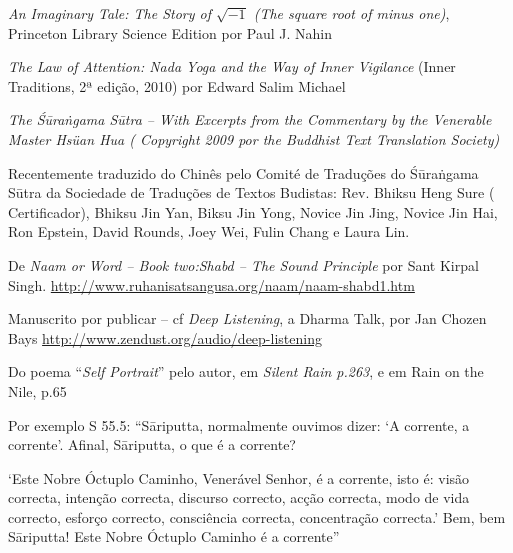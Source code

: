 \begin{thebibliography}{9}

 \emph{An Imaginary Tale: The Story of $\sqrt{-1}$ (The square root of
    minus one)}, Princeton Library Science Edition por Paul J. Nahin

 \emph{The Law of Attention: Nada Yoga and the Way of Inner Vigilance} (Inner Traditions, 2ª edição, 2010) por Edward Salim Michael
  
 \emph{The Śūraṅgama Sūtra -- With Excerpts from the
    Commentary by the Venerable Master Hsüan Hua ( Copyright 2009 por the
    Buddhist Text Translation Society)}

  Recentemente traduzido do Chinês pelo Comité de Traduções do Śūraṅgama Sūtra
  da Sociedade de Traduções de Textos Budistas: Rev. Bhiksu Heng Sure (
  Certificador), Bhiksu Jin Yan, Biksu Jin Yong, Novice Jin Jing, Novice Jin
  Hai, Ron Epstein, David Rounds, Joey Wei, Fulin Chang e Laura Lin.

 De \emph{Naam or Word -- Book two:Shabd -- The Sound Principle}
  por Sant Kirpal Singh.
  \url{http://www.ruhanisatsangusa.org/naam/naam-shabd1.htm}

 Manuscrito por publicar -- cf \emph{Deep Listening}, a Dharma
  Talk, por Jan Chozen Bays \url{http://www.zendust.org/audio/deep-listening}

 Do poema ``\emph{Self Portrait}'' pelo autor, em \emph{Silent
    Rain p.263}, e em Rain on the Nile, p.65

 Por exemplo S 55.5: ``Sāriputta, normalmente ouvimos dizer: `A
corrente, a corrente'. Afinal, Sāriputta, o que é a corrente?

`Este Nobre Óctuplo Caminho, Venerável Senhor, é a corrente, isto é: visão
correcta, intenção correcta, discurso correcto, acção correcta, modo de vida
correcto, esforço correcto, consciência correcta, concentração correcta.' Bem,
bem Sāriputta! Este Nobre Óctuplo Caminho é a corrente''

\end{thebibliography}




